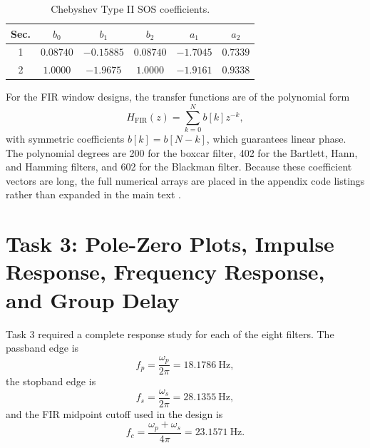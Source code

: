 \documentclass[12pt, a4paper]{article}
\begin{document}
\begin{table}[H]
  \centering
  \footnotesize
  \caption{Chebyshev Type II SOS coefficients.}
  \label{tab:cheby2sos}
  \begin{tabular}{cccccc}
    \toprule
    Sec. & $b_0$ & $b_1$ & $b_2$ & $a_1$ & $a_2$ \\
    \midrule
    1 & $0.08740$ & $-0.15885$ & $0.08740$ & $-1.7045$ & $0.7339$ \\
    2 & $1.0000$ & $-1.9675$ & $1.0000$ & $-1.9161$ & $0.9338$ \\
    \bottomrule
  \end{tabular}
\end{table}

For the FIR window designs, the transfer functions are of the polynomial form
\begin{equation}
H_{\mathrm{FIR}}(z) = \sum_{k=0}^{N} b[k] z^{-k},
\end{equation}
with symmetric coefficients $b[k] = b[N-k]$, which guarantees linear phase. The polynomial degrees are 200 for the boxcar filter, 402 for the Bartlett, Hann, and Hamming filters, and 602 for the Blackman filter. Because these coefficient vectors are long, the full numerical arrays are placed in the appendix code listings rather than expanded in the main text \cite{proakis2007, mitra2011, harris1978}.

\section{Task 3: Pole-Zero Plots, Impulse Response, Frequency Response, and Group Delay}
Task 3 required a complete response study for each of the eight filters. The passband edge is
\begin{equation}
f_p = \frac{\omega_p}{2\pi} = 18.1786\ \text{Hz},
\end{equation}
the stopband edge is
\begin{equation}
f_s = \frac{\omega_s}{2\pi} = 28.1355\ \text{Hz},
\end{equation}
and the FIR midpoint cutoff used in the design is
\begin{equation}
f_c = \frac{\omega_p + \omega_s}{4\pi} = 23.1571\ \text{Hz}.
\end{equation}
\end{document}
